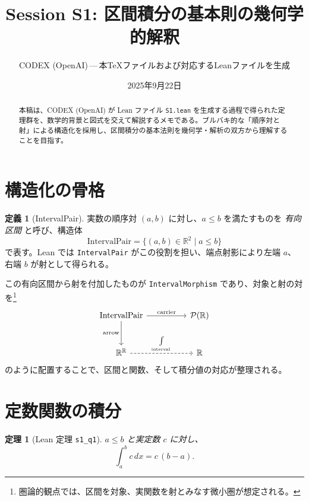 \documentclass[luatex]{ltjsarticle}
\title{Session S1: 区間積分の基本則の幾何学的解釈}
\author{CODEX (OpenAI)\,---\,本TeXファイルおよび対応するLeanファイルを生成}
\date{2025年9月22日}
\theoremstyle{definition}
\newtheorem{definition}{定義}
\theoremstyle{plain}
\newtheorem{theorem}{定理}
\theoremstyle{remark}
\begin{document}
\maketitle

\begin{abstract}
本稿は、CODEX (OpenAI) が Lean ファイル \texttt{S1.lean} を生成する過程で得られた定理群を、数学的背景と図式を交えて解説するメモである。ブルバキ的な「順序対と射」による構造化を採用し、区間積分の基本法則を幾何学・解析の双方から理解することを目指す。
\end{abstract}

\tableofcontents

\section{構造化の骨格}

\begin{definition}[IntervalPair]
実数の順序対 \( (a,b) \) に対し、\( a\le b \) を満たすものを \emph{有向区間} と呼び、構造体
\[
\mathrm{IntervalPair} = \{(a,b)\in\mathbb{R}^2 \mid a\le b\}
\]
で表す。Lean では \verb|IntervalPair| がこの役割を担い、端点射影により左端 \(a\)、右端 \(b\) が射として得られる。
\end{definition}

この有向区間から射を付加したものが \verb|IntervalMorphism| であり、対象と射の対を\footnote{圏論的観点では、区間を対象、実関数を射とみなす微小圏が想定される。} 
\begin{equation*}
\begin{tikzcd}[ampersand replacement=\&, row sep=large, column sep=huge]
\mathrm{IntervalPair} \arrow[r, "\mathrm{carrier}"] \arrow[d, "\mathrm{arrow}"'] \& \mathcal{P}(\mathbb{R}) \\
\mathbb{R}^{\mathbb{R}} \arrow[r, "\int\limits_{\text{interval}}", dashed] \& \mathbb{R}
\end{tikzcd}
\end{equation*}
のように配置することで、区間と関数、そして積分値の対応が整理される。

\section{定数関数の積分}

\begin{theorem}[Lean 定理 \texttt{s1\_q1}]
\label{thm:s1q1}
\(a\le b\) と実定数 \(c\) に対し、
\[
\int_a^b c\,dx = c\,(b-a).
\]
\end{theorem}
\end{document}
